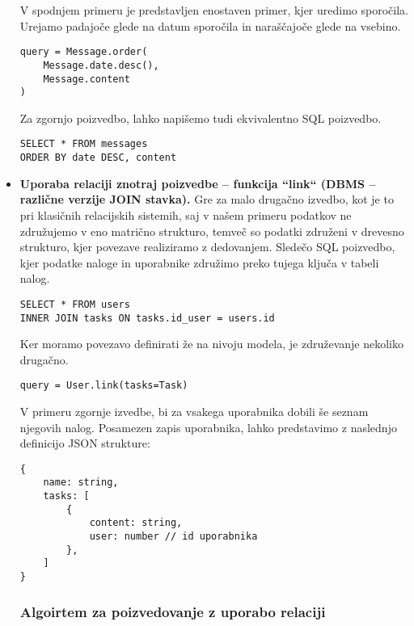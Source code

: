 \documentclass[a4paper,12pt,openright]{book}
\begin{document}
\begin{itemize}
        V spodnjem primeru je predstavljen enostaven primer, kjer uredimo sporočila. Urejamo padajoče glede na datum sporočila in naraščajoče glede na vsebino.

\begin{verbatim}
query = Message.order(
    Message.date.desc(),
    Message.content
)
\end{verbatim}    

        \noindent
        Za zgornjo poizvedbo, lahko napišemo tudi ekvivalentno SQL poizvedbo.

\begin{verbatim}
SELECT * FROM messages
ORDER BY date DESC, content
\end{verbatim}          

        \item \textbf{Uporaba relaciji znotraj poizvedbe – funkcija ``link`` (DBMS – različne verzije JOIN stavka).}
        \noindent
        Gre za malo drugačno izvedbo, kot je to pri klasičnih relacijskih sistemih, saj v našem primeru podatkov ne združujemo v eno matrično strukturo, temveč so podatki združeni v drevesno strukturo, kjer povezave realiziramo z dedovanjem. Sledečo SQL poizvedbo, kjer podatke naloge in uporabnike združimo preko tujega ključa v tabeli nalog.

\begin{verbatim}
SELECT * FROM users
INNER JOIN tasks ON tasks.id_user = users.id
\end{verbatim}

        \noindent
        Ker moramo povezavo definirati že na nivoju modela, je združevanje nekoliko drugačno.

\begin{verbatim}
query = User.link(tasks=Task)
\end{verbatim}

        \noindent
        V primeru zgornje izvedbe, bi za vsakega uporabnika dobili še seznam njegovih nalog. Posamezen zapis uporabnika, lahko predstavimo z naslednjo definicijo JSON strukture:
\begin{verbatim}
{
    name: string,
    tasks: [
        {
            content: string,
            user: number // id uporabnika
        },
    ]
}
\end{verbatim}

        \subsubsection{Algoirtem za poizvedovanje z uporabo relaciji}


\end{itemize}
\end{document}
